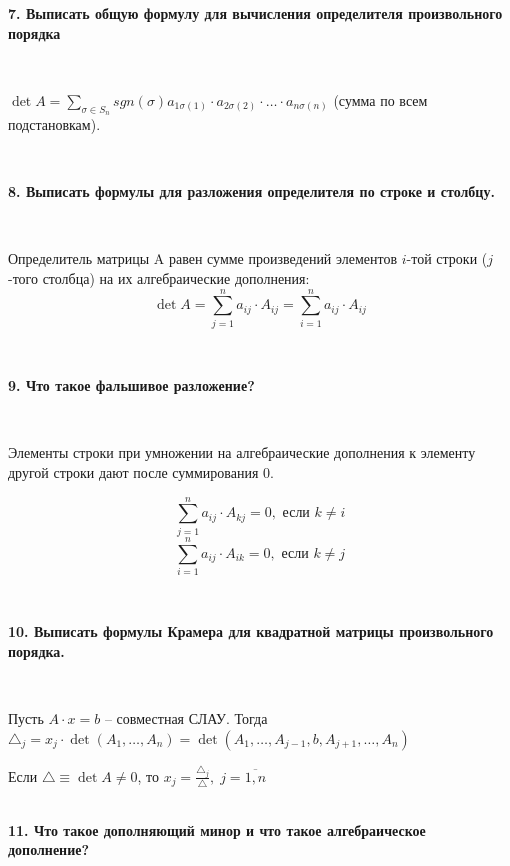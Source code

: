 \documentclass{article}
\begin{document}
	\textbf{7. Выписать общую формулу для вычисления определителя произвольного порядка} 
	
	{
		$\;$
		\setlength{\parindent}{0.4cm}
		\hangindent=0.4cm
		
		$\det A=\sum\limits_{\sigma\in S_n} sgn(\sigma) a_{1\sigma(1)}\cdot a_{2\sigma(2)}\cdot\ldots\cdot a_{n\sigma(n)}$ (сумма по всем подстановкам).
		
		$\;$
		\setlength{\parindent}{0cm}
		\hangindent=0cm
	}
	
	\textbf{8. Выписать формулы для разложения определителя по строке и столбцу.} 
	
	{
		$\;$
		\setlength{\parindent}{0.4cm}
		\hangindent=0.4cm
		
		Определитель матрицы  A  равен сумме произведений элементов $i$-той строки ($j$-того столбца) на их алгебраические дополнения:
	$$\det A=\sum\limits_{j=1}^n a_{ij}\cdot A_{ij}=\sum\limits_{i=1}^n a_{ij}\cdot A_{ij}$$
		
		$\;$
		\setlength{\parindent}{0cm}
		\hangindent=0cm
	}
	
	\newpage
	
	\textbf{9. Что такое фальшивое разложение?} 
	
	{
		$\;$
		\setlength{\parindent}{0.4cm}
		\hangindent=0.4cm
		
		Элементы строки при умножении на алгебраические дополнения к элементу другой строки дают после суммирования 0.
		
		$$\sum\limits_{j=1}^n a_{ij}\cdot A_{kj}=0,\text{ если }k\ne i$$
		$$\sum\limits_{i=1}^n a_{ij}\cdot A_{ik}=0,\text{ если }k\ne j$$
		
		$\;$
		\setlength{\parindent}{0cm}
		\hangindent=0cm
	}

	\textbf{10. Выписать формулы Крамера для квадратной матрицы произвольного порядка.}
	
	{
		$\;$
		\setlength{\parindent}{0.4cm}
		\hangindent=0.4cm
		
		Пусть $A\cdot x=b$ -- совместная СЛАУ. Тогда $\triangle_j = x_j\cdot\det(A_1,\ldots, A_n)=\det(A_1, \ldots, A_{j-1}, b, A_{j+1}, \ldots, A_n)$
		
		Если $\triangle\equiv\det A\ne 0$, то
		$x_j=\frac{\triangle_j}{\triangle}, \; j=\overline{1, n}$\\
		
		$\;$
		\setlength{\parindent}{0cm}
		\hangindent=0cm
	}
	
	\textbf{11. Что такое дополняющий минор и что такое алгебраическое дополнение?} 
	
\end{document}

